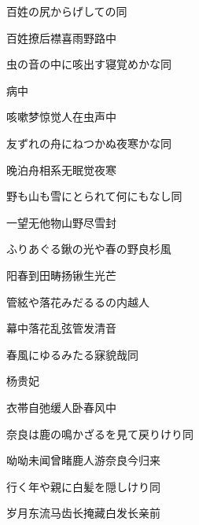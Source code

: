 \begin{haiku}
    {\FH 百姓の尻からげしての}\hfill{\FH 同}

    {\FK 百姓撩后襟喜雨野路中}
\end{haiku}

\begin{haiku}
    {\FH 虫の音の中に咳出す寝覚めかな}\hfill{\FH 同}

    {\FK 病中}

    {\FK 咳嗽梦惊觉人在虫声中}
\end{haiku}

\begin{haiku}
    {\FH 友ずれの舟にねつかぬ夜寒かな}\hfill{\FH 同}

    {\FK 晚泊舟相系无眠觉夜寒}
\end{haiku}

\begin{haiku}
    {\FH 野も山も雪にとられて何にもなし}\hfill{\FH 同}

    {\FK 一望无他物山野尽雪封}
\end{haiku}

\begin{haiku}
    {\FH ふりあぐる鍬の光や春の野良}\hfill{\FH 杉風}

    {\FK 阳春到田畴扬锹生光芒}
\end{haiku}

\begin{haiku}
    {\FH 管絃や落花みだるるの内}\hfill{\FH 越人}

    {\FK 幕中落花乱弦管发清音}
\end{haiku}

\begin{haiku}
    {\FH 春風にゆるみたる寐貌哉}\hfill{\FH 同}

    {\FK 杨贵妃}

    {\FK 衣帯自弛缓人卧春风中}
\end{haiku}

\begin{haiku}
    {\FH 奈良は鹿の鳴かざるを見て戻りけり}\hfill{\FH 同}

    {\FK 呦呦未闻曾睹鹿人游奈良今归来}
\end{haiku}

\begin{haiku}
    {\FH 行く年や親に白髪を隠しけり}\hfill{\FH 同}

    {\FK 岁月东流马齿长掩藏白发长亲前}
\end{haiku}

